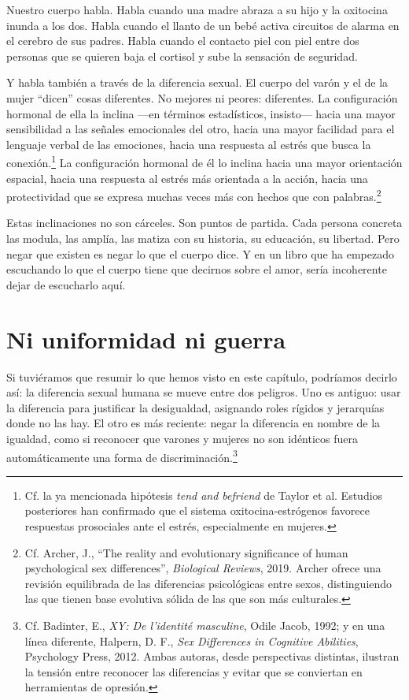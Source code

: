 Nuestro cuerpo habla. Habla cuando una madre abraza a su hijo y la oxitocina inunda a los dos. Habla cuando el llanto de un bebé activa circuitos de alarma en el cerebro de sus padres. Habla cuando el contacto piel con piel entre dos personas que se quieren baja el cortisol y sube la sensación de seguridad.

Y habla también a través de la diferencia sexual. El cuerpo del varón y el de la mujer ``dicen'' cosas diferentes. No mejores ni peores: diferentes. La configuración hormonal de ella la inclina ---en términos estadísticos, insisto--- hacia una mayor sensibilidad a las señales emocionales del otro, hacia una mayor facilidad para el lenguaje verbal de las emociones, hacia una respuesta al estrés que busca la conexión.\footnote{Cf. la ya mencionada hipótesis \textit{tend and befriend} de Taylor et al. Estudios posteriores han confirmado que el sistema oxitocina-estrógenos favorece respuestas prosociales ante el estrés, especialmente en mujeres.} La configuración hormonal de él lo inclina hacia una mayor orientación espacial, hacia una respuesta al estrés más orientada a la acción, hacia una protectividad que se expresa muchas veces más con hechos que con palabras.\footnote{Cf. Archer, J., ``The reality and evolutionary significance of human psychological sex differences'', \textit{Biological Reviews}, 2019. Archer ofrece una revisión equilibrada de las diferencias psicológicas entre sexos, distinguiendo las que tienen base evolutiva sólida de las que son más culturales.}

Estas inclinaciones no son cárceles. Son puntos de partida. Cada persona concreta las modula, las amplía, las matiza con su historia, su educación, su libertad. Pero negar que existen es negar lo que el cuerpo dice. Y en un libro que ha empezado escuchando lo que el cuerpo tiene que decirnos sobre el amor, sería incoherente dejar de escucharlo aquí.

\section{Ni uniformidad ni guerra}

Si tuviéramos que resumir lo que hemos visto en este capítulo, podríamos decirlo así: la diferencia sexual humana se mueve entre dos peligros. Uno es antiguo: usar la diferencia para justificar la desigualdad, asignando roles rígidos y jerarquías donde no las hay. El otro es más reciente: negar la diferencia en nombre de la igualdad, como si reconocer que varones y mujeres no son idénticos fuera automáticamente una forma de discriminación.\footnote{Cf. Badinter, E., \textit{XY: De l'identité masculine}, Odile Jacob, 1992; y en una línea diferente, Halpern, D. F., \textit{Sex Differences in Cognitive Abilities}, Psychology Press, 2012. Ambas autoras, desde perspectivas distintas, ilustran la tensión entre reconocer las diferencias y evitar que se conviertan en herramientas de opresión.}

